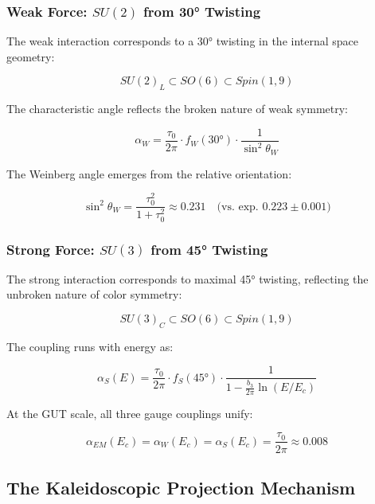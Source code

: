 \subsubsection{Weak Force: $SU(2)$ from 30° Twisting}

The weak interaction corresponds to a 30° twisting in the internal space geometry:

\begin{equation}
    SU(2)_L \subset SO(6) \subset Spin(1,9)
\end{equation}

The characteristic angle reflects the broken nature of weak symmetry:

\begin{equation}
    \alpha_W = \frac{\tau_0}{2\pi} \cdot f_W(30°) \cdot \frac{1}{\sin^2\theta_W}
\end{equation}

The Weinberg angle emerges from the relative orientation:

\begin{equation}
    \sin^2\theta_W = \frac{\tau_0^2}{1 + \tau_0^2} \approx 0.231
\quad \text{(vs. exp. } 0.223 \pm 0.001\text{)}
\end{equation}

\subsubsection{Strong Force: $SU(3)$ from 45° Twisting}

The strong interaction corresponds to maximal 45° twisting, reflecting the unbroken nature of color symmetry:

\begin{equation}
    SU(3)_C \subset SO(6) \subset Spin(1,9)
\end{equation}

The coupling runs with energy as:

\begin{equation}
    \alpha_S(E) = \frac{\tau_0}{2\pi} \cdot f_S(45°) \cdot \frac{1}{1 - \frac{b_3}{2\pi}\ln(E/E_c)}
\end{equation}

At the GUT scale, all three gauge couplings unify:

\begin{equation}
    \alpha_{EM}(E_c) = \alpha_W(E_c) = \alpha_S(E_c) = \frac{\tau_0}{2\pi} \approx 0.008
\end{equation}

\subsection{The Kaleidoscopic Projection Mechanism}

